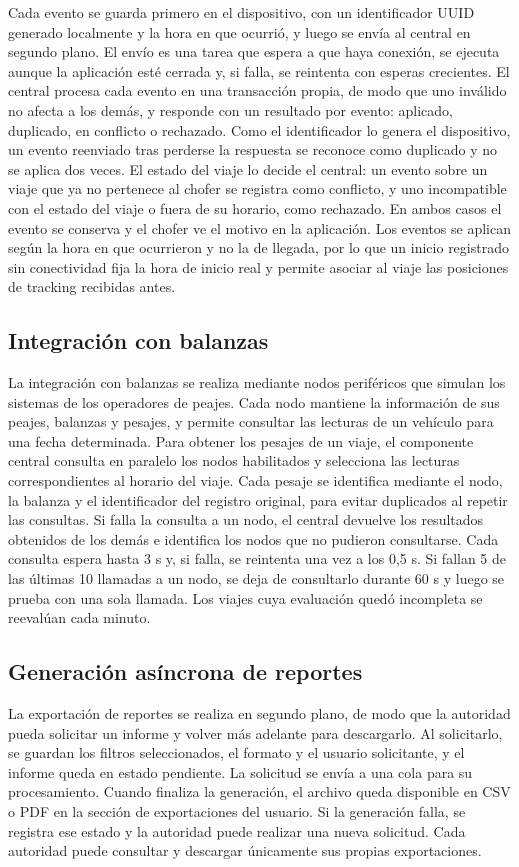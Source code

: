Cada evento se guarda primero en el dispositivo, con un identificador UUID generado localmente y la hora en que ocurrió, y luego se envía al central en segundo plano. El envío es una tarea que espera a que haya conexión, se ejecuta aunque la aplicación esté cerrada y, si falla, se reintenta con esperas crecientes. El central procesa cada evento en una transacción propia, de modo que uno inválido no afecta a los demás, y responde con un resultado por evento: aplicado, duplicado, en conflicto o rechazado. Como el identificador lo genera el dispositivo, un evento reenviado tras perderse la respuesta se reconoce como duplicado y no se aplica dos veces. El estado del viaje lo decide el central: un evento sobre un viaje que ya no pertenece al chofer se registra como conflicto, y uno incompatible con el estado del viaje o fuera de su horario, como rechazado. En ambos casos el evento se conserva y el chofer ve el motivo en la aplicación. Los eventos se aplican según la hora en que ocurrieron y no la de llegada, por lo que un inicio registrado sin conectividad fija la hora de inicio real y permite asociar al viaje las posiciones de tracking recibidas antes.

\subsection{Integración con balanzas}
La integración con balanzas se realiza mediante nodos periféricos que simulan los sistemas de los operadores de peajes. Cada nodo mantiene la información de sus peajes, balanzas y pesajes, y permite consultar las lecturas de un vehículo para una fecha determinada. Para obtener los pesajes de un viaje, el componente central consulta en paralelo los nodos habilitados y selecciona las lecturas correspondientes al horario del viaje. Cada pesaje se identifica mediante el nodo, la balanza y el identificador del registro original, para evitar duplicados al repetir las consultas. Si falla la consulta a un nodo, el central devuelve los resultados obtenidos de los demás e identifica los nodos que no pudieron consultarse. Cada consulta espera hasta 3 s y, si falla, se reintenta una vez a los 0,5 s. Si fallan 5 de las últimas 10 llamadas a un nodo, se deja de consultarlo durante 60 s y luego se prueba con una sola llamada. Los viajes cuya evaluación quedó incompleta se reevalúan cada minuto.

\subsection{Generación asíncrona de reportes}
La exportación de reportes se realiza en segundo plano, de modo que la autoridad pueda solicitar un informe y volver más adelante para descargarlo. Al solicitarlo, se guardan los filtros seleccionados, el formato y el usuario solicitante, y el informe queda en estado pendiente. La solicitud se envía a una cola para su procesamiento. Cuando finaliza la generación, el archivo queda disponible en CSV o PDF en la sección de exportaciones del usuario. Si la generación falla, se registra ese estado y la autoridad puede realizar una nueva solicitud. Cada autoridad puede consultar y descargar únicamente sus propias exportaciones.


